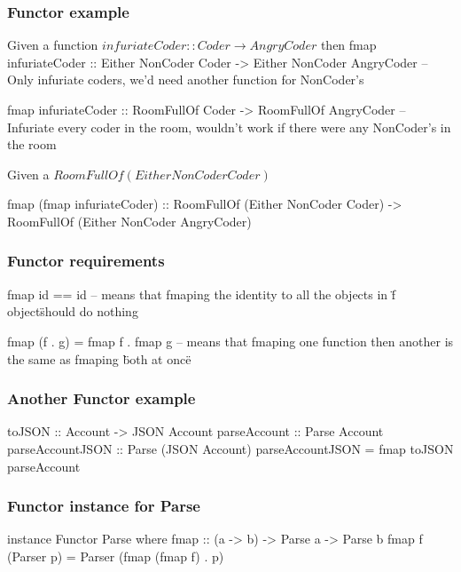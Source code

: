 \documentclass{beamer}
\begin{document}
\begin{frame}
\frametitle{Functor example}
Given a function $infuriateCoder :: Coder \to AngryCoder$ then
 fmap infuriateCoder :: Either NonCoder Coder -> Either NonCoder AngryCoder
 -- Only infuriate coders, we'd need another function for NonCoder's

 fmap infuriateCoder :: RoomFullOf Coder -> RoomFullOf AngryCoder
 -- Infuriate every coder in the room, wouldn't work if there were any NonCoder's in the room

Given a $RoomFullOf (Either NonCoder Coder)$

 fmap (fmap infuriateCoder) :: RoomFullOf (Either NonCoder Coder) -> RoomFullOf (Either NonCoder AngryCoder)

\end{frame}


\begin{frame}
\frametitle{Functor requirements}
 fmap id == id
 -- means that fmaping the identity to all the objects in \"f object\" should do nothing

 fmap (f . g) = fmap f . fmap g
 -- means that fmaping one function then another is the same as fmaping \"both at once\"

\end{frame}


%
%


\begin{frame}
\frametitle{Another Functor example}
 toJSON :: Account -> JSON Account
%
 parseAccount :: Parse Account
%
 parseAccountJSON :: Parse (JSON Account)
 parseAccountJSON = fmap toJSON parseAccount
%
\end{frame}


\begin{frame}
\frametitle{Functor instance for Parse}
instance Functor Parse where
  fmap :: (a -> b) -> Parse a -> Parse b
  fmap f (Parser p) = Parser (fmap (fmap f) . p)
%
\end{frame}
\end{document}
